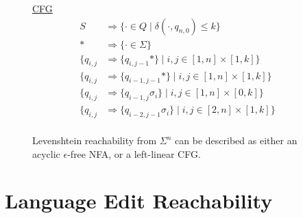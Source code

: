 \documentclass[sigplan,review,anonymous,acmsmall]{acmart}\settopmatter{printfolios=false,printccs=false,printacmref=false}
\begin{document}
\begin{figure}[H]
\begin{minipage}[c]{0.45\textwidth}
{
}
\end{minipage}
\hfill
\begin{minipage}[l]{5 cm}
\centering
\underline{CFG}\vspace{7pt}
\begin{align*}
S &\Rightarrow \{\cdot \in Q \mid \delta(\cdot, q_{n,0}) \leq k\}\\
* &\Rightarrow \{\cdot \in \Sigma\}\\
\big\{q_{i, j} &\Rightarrow \{q_{i, j-1}*\} \mid i, j \in [1, n]\times[1, k]\big\}\\
\big\{q_{i, j} &\Rightarrow \{q_{i-1, j-1}*\}\mid i, j\in[1, n]\times [1, k]\big\}\\
\big\{q_{i, j} &\Rightarrow \{q_{i-1, j} \sigma_i \}\mid i, j \in [1, n]\times[0, k]\big\} \\
\big\{q_{i, j} &\Rightarrow \{q_{i-2, j-1} \sigma_i\} \mid i, j \in [2, n]\times[1, k] \big\}\\
\end{align*}
\end{minipage}
\caption{Levenshtein reachability from $\Sigma^n$ can be described as either an acyclic $\epsilon$-free NFA, or a left-linear CFG.}
\end{figure}

\section{Language Edit Reachability}\label{sec:editreach}
\end{document}
